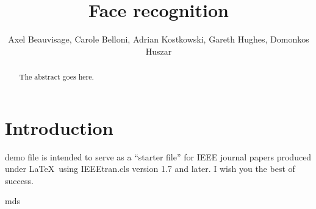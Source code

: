 \documentclass[journal]{IEEEtran}
\begin{document}
%
\title{Face recognition}

\author{Axel Beauvisage, Carole Belloni, Adrian Kostkowski, Gareth Hughes, Domonkos Huszar}


\maketitle


\begin{abstract}
The abstract goes here.
\end{abstract}


\IEEEpeerreviewmaketitle



\section{Introduction}
% 
% 
% 
% 
 demo file is intended to serve as a ``starter file''
for IEEE journal papers produced under \LaTeX\ using
IEEEtran.cls version 1.7 and later.
I wish you the best of success.

\hfill mds
 
\end{document}
